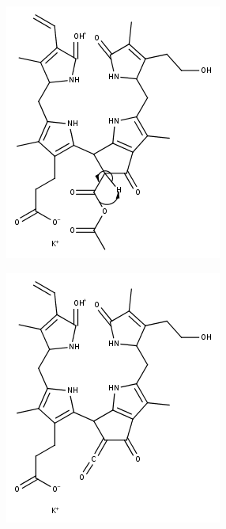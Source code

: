 \begin{figure}[!htbp]
  \begin{subfigure}[b]{0.5\textwidth}
    \includegraphics[width=\textwidth, height=\textwidth]{figures/Kapitel4/Kataboliten/fragmentation_structures/VWA_Katabolit_699-639_MK_electronMovement.png}
    \caption{}
    \label{fig:699MKelectronMovement}
  \end{subfigure}
  \hfill
  \begin{subfigure}[b]{0.5\textwidth}
    \includegraphics[width=\textwidth, height=\textwidth]{figures/Kapitel4/Kataboliten/fragmentation_structures/VWA_Katabolit_699-639_MK.png}

\end{subfigure}
\end{figure}
